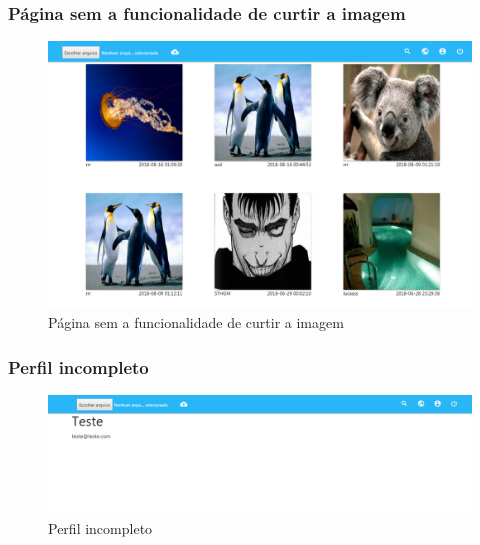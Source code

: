 \pagebreak

\subsubsection{Página sem a funcionalidade de curtir a imagem}
\begin{figure}[ht]
	\centering
	\includegraphics[width=\textwidth]{./imagens/botao_curtir.png}
	\caption{Página sem a funcionalidade de curtir a imagem}
	\label{fig:casoDeUso}
\end{figure}

\pagebreak

\subsubsection{Perfil incompleto}
\begin{figure}[ht]
	\centering
	\includegraphics[width=\textwidth]{./imagens/perfil_desarrumado.png}
	\caption{Perfil incompleto}
	\label{fig:casoDeUso}
\end{figure}

\pagebreak

